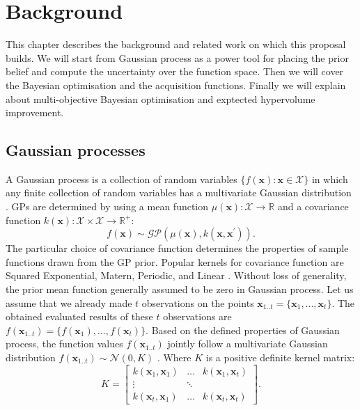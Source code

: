 \chapter{Background}
This chapter describes the background and related work on which this proposal builds.
We will start from Gaussian process as a power tool for placing the prior belief and compute the uncertainty over the function space. Then we will cover the  Bayesian optimisation and the acquisition functions. Finally we will explain about multi-objective Bayesian optimisation and exptected hypervolume improvement.

\section{Gaussian processes}
A Gaussian process is a collection of random variables $\{f(\textbf{x}) : \textbf{x} \in \mathcal{X}\}$ in which any finite collection of random variables has a multivariate
Gaussian distribution \cite{rasmussen2006gaussian}. GPs are determined by using a mean function $\mu(\textbf{x}): \mathcal{X} \rightarrow \mathbb{R}$ and 
a covariance function $k(\textbf{x}): \mathcal{X} \times \mathcal{X} \rightarrow \mathbb{R}^+$:
\begin{equation}
f(\textbf{x}) \sim \mathcal{GP}(\mu(\textbf{x}),k(\textbf{x},\textbf{x}^{\prime})).
\end{equation}
The particular choice of covariance function determines the properties of sample functions drawn from the GP prior.
Popular kernels for covariance function are Squared Exponential, Matern, Periodic, and Linear \cite{wilson2013gaussian}. 
Without loss of generality, the prior mean function generally assumed to be zero in Gaussian process.
Let us assume that we already made $t$ observations on the points $\textbf{x}_{1..t} = \{\textbf{x}_1,...,\textbf{x}_t\}$. The obtained evaluated results of these $t$ observations are $f(\textbf{x}_{1..t}) = \{f(\textbf{x}_1),...,f(\textbf{x}_t)\}$. Based on the defined properties of Gaussian process, the function values  $f(\textbf{x}_{1..t})$ jointly follow a multivariate Gaussian distribution $f(\textbf{x}_{1..t}) \sim \mathcal{N}(0,K)$ \cite{li2017rapid}. Where $K$ is a positive definite kernel matrix:
\[
K = \begin{bmatrix} 
    k(\textbf{x}_1,\textbf{x}_1) & \dots & k(\textbf{x}_1,\textbf{x}_t)\\
    \vdots & \ddots  \\
    k(\textbf{x}_t,\textbf{x}_1) & \dots  & k(\textbf{x}_t,\textbf{x}_t)
    \end{bmatrix}.
\]

